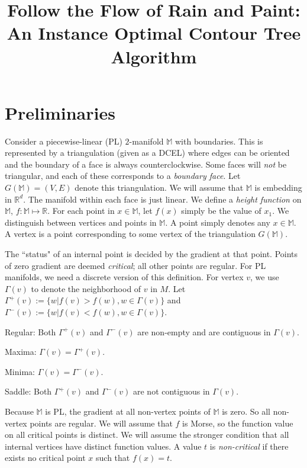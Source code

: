 \documentclass[11pt]{article}
\author{}
\title{Follow the Flow of Rain and Paint: An Instance Optimal Contour Tree Algorithm}
\date{}
\theoremstyle{definition}
\newcommand{\innbd}{\Gamma^-}
\newcommand{\nbd}{\Gamma}
\newcommand{\outnbd}{\Gamma^+}
\newcommand{\MM}{\mathbb{M}}
\newcommand{\RR}{\mathbb{R}}
\begin{document}
\maketitle



\section{Preliminaries}
Consider a piecewise-linear (PL) $2$-manifold $\MM$ with boundaries.
This is represented by a triangulation (given as a DCEL) where edges
can be oriented and the boundary of a face is always counterclockwise. Some faces will \emph{not}
be triangular, and each of these corresponds to a \emph{boundary face}.
Let $G(\MM) = (V,E)$ denote this triangulation. 
We will assume that $\MM$ is embedding in $\RR^d$.
The manifold within each face is just linear.
We define a \emph{height function} on $\MM$, $f:\MM \mapsto \RR$. For each point in $x \in \MM$, let $f(x)$ simply be the value of $x_1$.
We distinguish between vertices and points in $\MM$. A point simply denotes any $x \in \MM$. A vertex is a point
corresponding to some vertex of the triangulation $G(\MM)$.

The ``status" of an internal point is decided by the gradient at that point. Points of zero gradient are deemed \emph{critical};
all other points are regular.
For PL manifolds, we need a discrete version of this definition.
For vertex $v$, we use $\nbd(v)$ to denote the neighborhood of $v$ in $M$. Let $\outnbd(v) := \{ w | f(v) > f(w), w \in \Gamma(v)\}$
and $\innbd(v) := \{w | f(v) < f(w), w \in \Gamma(v)\}$. 
\smallskip
\begin{asparaenum}
	\item Regular: Both $\outnbd(v)$ and $\innbd(v)$ are non-empty and are contiguous in $\nbd(v)$.
	\item Maxima: $\nbd(v) = \outnbd(v)$.
	\item Minima: $\nbd(v) = \innbd(v)$.
	\item Saddle: Both $\outnbd(v)$ and $\innbd(v)$ are not contiguous in $\nbd(v)$.
\end{asparaenum}
\smallskip
Because $\MM$ is PL, the gradient at all non-vertex points of $\MM$ is zero.
So all non-vertex points are regular. We will assume that $f$ is Morse, so the function value on all critical points is distinct. We will assume the stronger condition that all internal
vertices have distinct function values.
A value $t$ is \emph{non-critical} if there exists no critical point $x$ such that $f(x) = t$.
\end{document}
